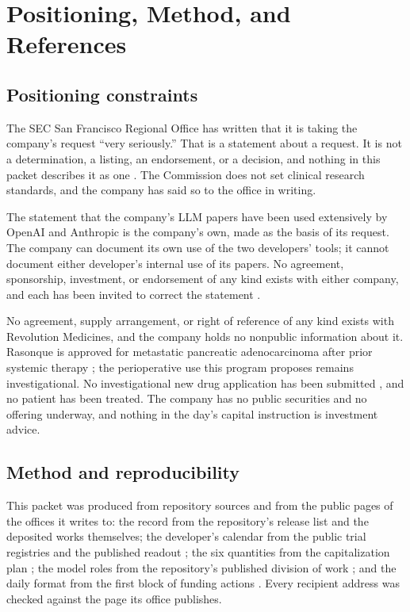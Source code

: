 \section{Positioning, Method, and References}

\subsection{Positioning constraints}

The SEC San Francisco Regional Office has written that it is taking the
company's request ``very seriously.'' That is a statement about a request. It is
not a determination, a listing, an endorsement, or a decision, and nothing in
this packet describes it as one \cite{secsf2026}. The Commission does not set
clinical research standards, and the company has said so to the office in
writing.

The statement that the company's LLM papers have been used extensively by OpenAI
and Anthropic is the company's own, made as the basis of its request. The
company can document its own use of the two developers' tools; it cannot
document either developer's internal use of its papers. No agreement,
sponsorship, investment, or endorsement of any kind exists with either company,
and each has been invited to correct the statement \cite{tripartisan2026}.

No agreement, supply arrangement, or right of reference of any kind exists with
Revolution Medicines, and the company holds no nonpublic information about it.
Rasonque is approved for metastatic pancreatic adenocarcinoma after prior
systemic therapy \cite{fdarasonque2026}; the perioperative use this program
proposes remains investigational. No investigational new drug application has
been submitted \cite{ecfr2026part312}, and no patient has been treated. The
company has no public securities and no offering underway, and nothing in the
day's capital instruction is investment advice.

\subsection{Method and reproducibility}

This packet was produced from repository sources and from the public pages of
the offices it writes to: the record from the repository's release list and the
deposited works themselves; the developer's calendar from the public trial
registries and the published readout \cite{ctgov001,ctgov302,ctgov304,rasolute302};
the six quantities from the capitalization plan \cite{capitalplan2026}; the
model roles from the repository's published division of work
\cite{tripartisan2026}; and the daily format from the first block of funding
actions \cite{autofund2026}. Every recipient address was checked against the
page its office publishes.

